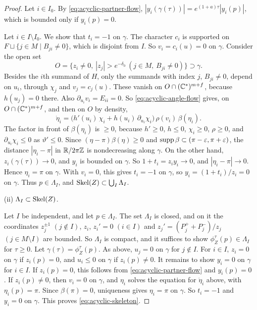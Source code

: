 \documentclass[12pt, letter]{amsart}
\theoremstyle{definition}
\begin{document}
\begin{proof}
Let $i\in I_0$.
By \eqref{eq:acyclic-partner-flow}, $|y_i(\gamma(\tau))|=e^{(1+a)\tau}|y_i(p)|$, which is bounded only if $y_i(p)=0$.

Let $i\in I\setminus I_0$.
We show that $t_i=-1$ on $\gamma$.
The character $c_i$ is supported on $F\sqcup\{j\in M\mid B_{ji}\ne0\}$, which is disjoint from $I$.
So $v_i=c_i(u)=0$ on $\gamma$.
Consider the open set
\[
 O=\bigl\{z_i\ne0,\ |z_j|>e^{-\delta_0}\ (j\in M,\ B_{ji}\ne0)\bigr\}\supset\gamma .
\]
Besides the $i$th summand of $H$, only the summands with index $j$, $B_{ji}\ne0$, depend on $u_i$, through $\chi_j$ and $v_j=c_j(u)$.
These vanish on $O\cap(\mathbb{C}^*)^{m+f}$, because $h(u_j)=0$ there.
Also $\partial_{u_i}v_i=E_{ii}=0$.
So \eqref{eq:acyclic-angle-flow} gives, on $O\cap(\mathbb{C}^*)^{m+f}$, and then on $O$ by density,
\[
 \dot\eta_i=\bigl(h'(u_i)\,\chi_i+h(u_i)\,\partial_{u_i}\chi_i\bigr)\,\rho(v_i)\,\beta(\eta_i).
\]
The factor in front of $\beta(\eta_i)$ is $\ge0$, because $h'\ge0$, $h\le0$, $\chi_i\ge0$, $\rho\ge0$, and $\partial_{u_i}\chi_i\le0$ as $\vartheta'\le0$.
Since $(\eta-\pi)\beta(\eta)\ge0$ and $\operatorname{supp}\beta\subset(\pi-\varepsilon,\pi+\varepsilon)$, the distance $|\eta_i-\pi|$ in $\mathbb{R}/2\pi\mathbb{Z}$ is nondecreasing along $\gamma$.
On the other hand, $z_i(\gamma(\tau))\to0$, and $y_i$ is bounded on $\gamma$.
So $1+t_i=z_iy_i\to0$, and $|\eta_i-\pi|\to0$.
Hence $\eta_i=\pi$ on $\gamma$.
With $v_i=0$, this gives $t_i=-1$ on $\gamma$, so $y_i=(1+t_i)/z_i=0$ on $\gamma$.
Thus $p\in\Lambda_I$, and $\operatorname{Skel}(Z)\subset\bigcup_I\Lambda_I$.

(ii) \( \Lambda_I \subset \operatorname{Skel}(Z)\). 

Let $I$ be independent, and let $p\in\Lambda_I$.
The set $\Lambda_I$ is closed, and on it the coordinates $z_j^{\pm1}$ $(j\notin I)$, $z_i$, $z_i'=0$ $(i\in I)$ and $z_j'=(P_j^++P_j^-)/z_j$ $(j\in M\setminus I)$ are bounded.
So $\Lambda_I$ is compact, and it suffices to show $\phi_Z^\tau(p)\in\Lambda_I$ for $\tau\ge0$.
Let $\gamma(\tau)=\phi_Z^\tau(p)$.
As above, $u_j=0$ on $\gamma$ for $j\notin I$.
For $i\in I$, $z_i=0$ on $\gamma$ if $z_i(p)=0$, and $u_i\le0$ on $\gamma$ if $z_i(p)\ne0$.
It remains to show $y_i=0$ on $\gamma$ for $i\in I$.
If $z_i(p)=0$, this follows from \eqref{eq:acyclic-partner-flow} and $y_i(p)=0$.
If $z_i(p)\ne0$, then $v_i=0$ on $\gamma$, and $\eta_i$ solves the equation for $\dot\eta_i$ above, with $\eta_i(p)=\pi$.
Since $\beta(\pi)=0$, uniqueness gives $\eta_i=\pi$ on $\gamma$.
So $t_i=-1$ and $y_i=0$ on $\gamma$.
This proves \eqref{eq:acyclic-skeleton}.
\end{proof}
\end{document}
